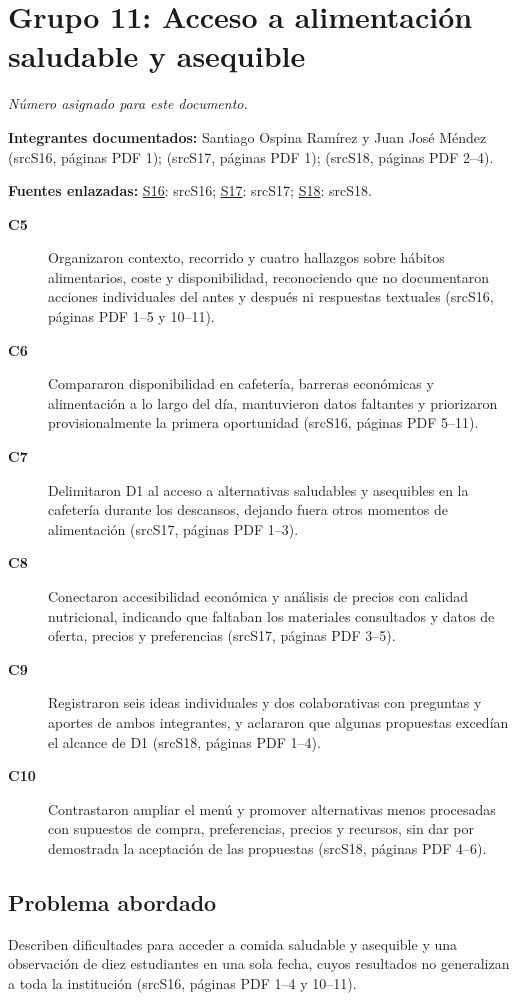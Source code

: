 \documentclass[11pt,a4paper]{article}
\newcommand{\evid}[2]{(\csname src#1\endcsname, páginas PDF #2)}
\begin{document}
\section*{Grupo 11: Acceso a alimentación saludable y asequible}
\textit{Número asignado para este documento.}

\textbf{Integrantes documentados:} Santiago Ospina Ramírez y Juan José Méndez \evid{S16}{1}; \evid{S17}{1}; \evid{S18}{2--4}.

\textbf{Fuentes enlazadas:} \hyperlink{fuente-S16}{S16}: \csname srcS16\endcsname; \hyperlink{fuente-S17}{S17}: \csname srcS17\endcsname; \hyperlink{fuente-S18}{S18}: \csname srcS18\endcsname.

\begin{description}
\item[\textbf{C5}] Organizaron contexto, recorrido y cuatro hallazgos sobre hábitos alimentarios, coste y disponibilidad, reconociendo que no documentaron acciones individuales del antes y después ni respuestas textuales \evid{S16}{1--5 y 10--11}.
\item[\textbf{C6}] Compararon disponibilidad en cafetería, barreras económicas y alimentación a lo largo del día, mantuvieron datos faltantes y priorizaron provisionalmente la primera oportunidad \evid{S16}{5--11}.
\item[\textbf{C7}] Delimitaron D1 al acceso a alternativas saludables y asequibles en la cafetería durante los descansos, dejando fuera otros momentos de alimentación \evid{S17}{1--3}.
\item[\textbf{C8}] Conectaron accesibilidad económica y análisis de precios con calidad nutricional, indicando que faltaban los materiales consultados y datos de oferta, precios y preferencias \evid{S17}{3--5}.
\item[\textbf{C9}] Registraron seis ideas individuales y dos colaborativas con preguntas y aportes de ambos integrantes, y aclararon que algunas propuestas excedían el alcance de D1 \evid{S18}{1--4}.
\item[\textbf{C10}] Contrastaron ampliar el menú y promover alternativas menos procesadas con supuestos de compra, preferencias, precios y recursos, sin dar por demostrada la aceptación de las propuestas \evid{S18}{4--6}.
\end{description}
\subsection*{Problema abordado}
Describen dificultades para acceder a comida saludable y asequible y una observación de diez estudiantes en una sola fecha, cuyos resultados no generalizan a toda la institución \evid{S16}{1--4 y 10--11}.
\end{document}
